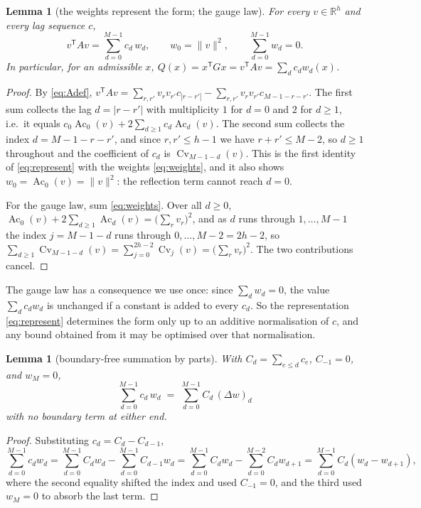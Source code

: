 \documentclass[11pt,a4paper]{article}
\theoremstyle{plain}
\newtheorem{lemma}[theorem]{Lemma}
\theoremstyle{definition}
\newcommand{\R}{\mathbb{R}}
\newcommand{\T}{\mathsf{T}}
\newcommand{\Ac}{\operatorname{Ac}}
\newcommand{\Cv}{\operatorname{Cv}}
\begin{document}
\begin{lemma}[the weights represent the form; the gauge law]
\label{lem:gauge}
For every $v\in\R^{h}$ and every lag sequence $c$,
\begin{equation}
\label{eq:represent}
  v^{\T}Av=\sum_{d=0}^{M-1}c_d\,w_d,
  \qquad
  w_0=\lVert v\rVert^{2},
  \qquad
  \sum_{d=0}^{M-1}w_d=0 .
\end{equation}
In particular, for an admissible $x$, $Q(x)=x^{\T}Gx=v^{\T}Av=\sum_dc_dw_d(x)$.
\end{lemma}

\begin{proof}
By \eqref{eq:Adef},
$v^{\T}Av=\sum_{r,r'}v_rv_{r'}c_{|r-r'|}-\sum_{r,r'}v_rv_{r'}c_{M-1-r-r'}$. The
first sum collects the lag $d=|r-r'|$ with multiplicity $1$ for $d=0$ and $2$
for $d\ge1$, i.e.\ it equals $c_0\Ac_0(v)+2\sum_{d\ge1}c_d\Ac_d(v)$. The second
sum collects the index $d=M-1-r-r'$, and
since $r,r'\le h-1$ we have $r+r'\le M-2$, so $d\ge1$ throughout and the
coefficient of $c_d$ is $\Cv_{M-1-d}(v)$. This is the first identity of
\eqref{eq:represent} with the weights \eqref{eq:weights}, and it also shows
$w_0=\Ac_0(v)=\lVert v\rVert^{2}$: the reflection term cannot reach $d=0$.

For the gauge law, sum \eqref{eq:weights}. Over all $d\ge0$,
$\Ac_0(v)+2\sum_{d\ge1}\Ac_d(v)=\bigl(\sum_rv_r\bigr)^{2}$, and as $d$ runs
through $1,\dots,M-1$ the index $j=M-1-d$ runs through $0,\dots,M-2=2h-2$, so
$\sum_{d\ge1}\Cv_{M-1-d}(v)=\sum_{j=0}^{2h-2}\Cv_j(v)
=\bigl(\sum_rv_r\bigr)^{2}$. The two contributions cancel.
\end{proof}

The gauge law has a consequence we use once: since $\sum_dw_d=0$, the value
$\sum_dc_dw_d$ is unchanged if a constant is added to every $c_d$. So the
representation \eqref{eq:represent} determines the form only up to an additive
normalisation of $c$, and any bound obtained from it may be optimised over that
normalisation.

\begin{lemma}[boundary-free summation by parts]
\label{lem:abel}
With $C_d=\sum_{e\le d}c_e$, $C_{-1}=0$, and $w_M=0$,
\begin{equation}
\label{eq:abel}
  \sum_{d=0}^{M-1}c_d\,w_d\;=\;\sum_{d=0}^{M-1}C_d\,(\Delta w)_d
\end{equation}
with no boundary term at either end.
\end{lemma}

\begin{proof}
Substituting $c_d=C_d-C_{d-1}$,
\[
  \sum_{d=0}^{M-1}c_dw_d
  =\sum_{d=0}^{M-1}C_dw_d-\sum_{d=0}^{M-1}C_{d-1}w_d
  =\sum_{d=0}^{M-1}C_dw_d-\sum_{d=0}^{M-2}C_dw_{d+1}
  =\sum_{d=0}^{M-1}C_d(w_d-w_{d+1}),
\]
where the second equality shifted the index and used $C_{-1}=0$, and the third
used $w_M=0$ to absorb the last term.
\end{proof}
\end{document}
